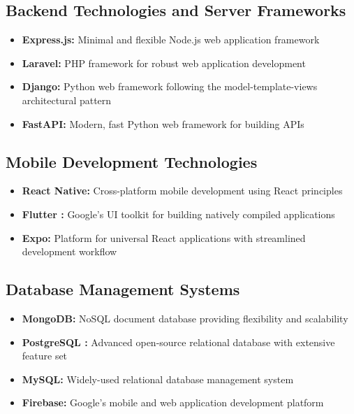 \documentclass[12pt,a4paper]{report}
\newcommand{\tool}[1]{\textcolor{toolcolor}{\textbf{#1}}}
\let\oldcite\cite
\renewcommand{\cite}[1]{\textcolor{impactcolor}{\oldcite{#1}}}
\newenvironment{coloritemize}
{\begin{itemize}[label=\textcolor{primaryblue}{$\bullet$}]}
{\end{itemize}}
\begin{document}
\subsection{Backend Technologies and Server Frameworks}
\begin{coloritemize}
    \item \tool{Express.js:} Minimal and flexible Node.js web application framework
    \item \tool{Laravel:} PHP framework for robust web application development
    \item \tool{Django:} Python web framework following the model-template-views architectural pattern
    \item \tool{FastAPI:} Modern, fast Python web framework for building APIs
\end{coloritemize}

\subsection{Mobile Development Technologies}
\begin{coloritemize}
    \item \tool{React Native:} Cross-platform mobile development using React principles
    \item \tool{Flutter \cite{ref4}:} Google's UI toolkit for building natively compiled applications
    \item \tool{Expo:} Platform for universal React applications with streamlined development workflow
\end{coloritemize}

\subsection{Database Management Systems}
\begin{coloritemize}
    \item \tool{MongoDB:} NoSQL document database providing flexibility and scalability
    \item \tool{PostgreSQL \cite{ref6}:} Advanced open-source relational database with extensive feature set
    \item \tool{MySQL:} Widely-used relational database management system
    \item \tool{Firebase:} Google's mobile and web application development platform
\end{coloritemize}
\end{document}
